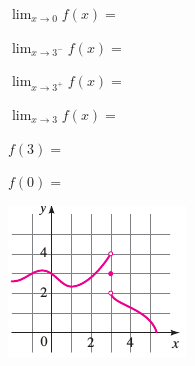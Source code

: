 \documentclass[10pt,twoside]{article}
\begin{document}
\begin{enumerate}
\begin{enumerate}
\begin{minipage}{.6\textwidth}
 \begin{enumerate}\begin{multicols}{2}
  \item $\displaystyle{\lim_{x\rightarrow 0}f(x)}=$
  \item $\displaystyle{\lim_{x\rightarrow 3^{-}}f(x)}=$
  \item $\displaystyle{\lim_{x\rightarrow 3^{+}}f(x)}=$
  \item $\displaystyle{\lim_{x\rightarrow 3}f(x)}=$
  \item $f(3)=$
  \item $f(0)=$
  \end{multicols}
 \end{enumerate}
\end{minipage}
\begin{minipage}{.35\textwidth}
 \includegraphics{./Images/funcionPto14.png}

\end{minipage}

 
 

\end{enumerate}

\end{enumerate}
\end{document}

